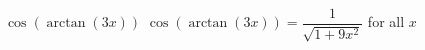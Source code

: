  {$\cos\left(\arctan\left(3x\right)\right)$}
{ $\cos\left(\arctan\left(3x\right)\right) = \dfrac{1}{\sqrt{1+9x^{2}}}$ for all $x$}
